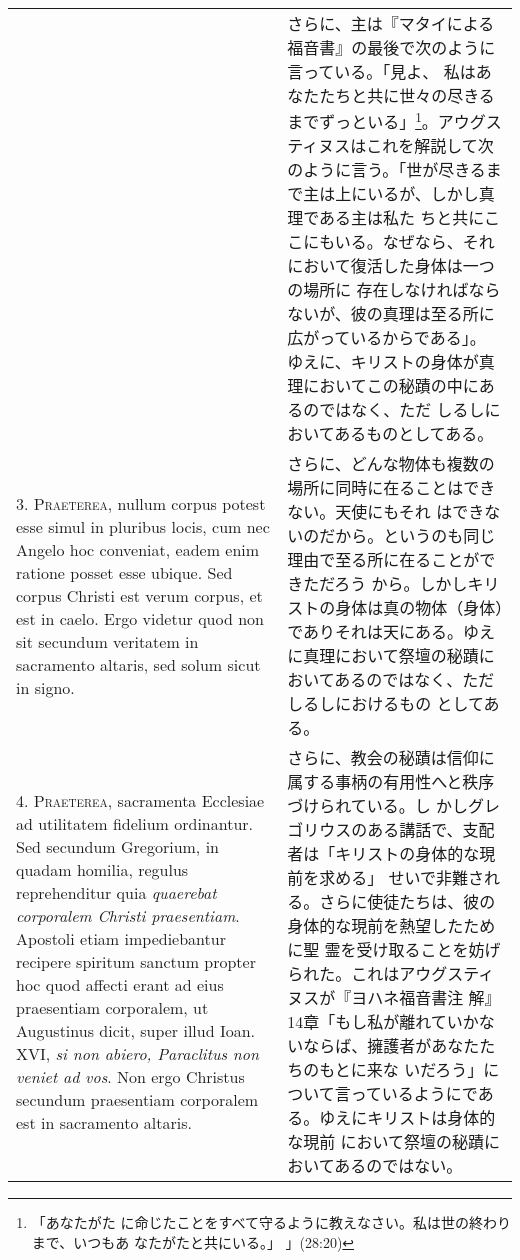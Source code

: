\documentclass[10pt]{jsarticle} %
\begin{document}
\begin{longtable}{p{21em}p{21em}}
&

さらに、主は『マタイによる福音書』の最後で次のように言っている。「見よ、
私はあなたたちと共に世々の尽きるまでずっといる」\footnote{「あなたがた
に命じたことをすべて守るように教えなさい。私は世の終わりまで、いつもあ
なたがたと共にいる。」 」(28:20)}。アウグスティヌスはこれを解説して次
のように言う。「世が尽きるまで主は上にいるが、しかし真理である主は私た
ちと共にここにもいる。なぜなら、それにおいて復活した身体は一つの場所に
存在しなければならないが、彼の真理は至る所に広がっているからである」。
ゆえに、キリストの身体が真理においてこの秘蹟の中にあるのではなく、ただ
しるしにおいてあるものとしてある。


\\




3. {\scshape Praeterea}, nullum corpus potest esse simul in pluribus
locis, cum nec Angelo hoc conveniat, eadem enim ratione posset esse
ubique. Sed corpus Christi est verum corpus, et est in caelo. Ergo
videtur quod non sit secundum veritatem in sacramento altaris, sed
solum sicut in signo.


&


さらに、どんな物体も複数の場所に同時に在ることはできない。天使にもそれ
はできないのだから。というのも同じ理由で至る所に在ることができただろう
から。しかしキリストの身体は真の物体（身体）でありそれは天にある。ゆえ
に真理において祭壇の秘蹟においてあるのではなく、ただしるしにおけるもの
としてある。

\\




4. {\scshape Praeterea}, sacramenta Ecclesiae ad utilitatem fidelium
ordinantur. Sed secundum Gregorium, in quadam homilia, regulus
reprehenditur quia {\itshape quaerebat corporalem Christi
praesentiam}. Apostoli etiam impediebantur recipere spiritum sanctum
propter hoc quod affecti erant ad eius praesentiam corporalem, ut
Augustinus dicit, super illud Ioan. XVI, {\itshape si non abiero,
Paraclitus non veniet ad vos}. Non ergo Christus secundum praesentiam
corporalem est in sacramento altaris.

&

さらに、教会の秘蹟は信仰に属する事柄の有用性へと秩序づけられている。し
かしグレゴリウスのある講話で、支配者は「キリストの身体的な現前を求める」
せいで非難される。さらに使徒たちは、彼の身体的な現前を熱望したために聖
霊を受け取ることを妨げられた。これはアウグスティヌスが『ヨハネ福音書注
解』14章「もし私が離れていかないならば、擁護者があなたたちのもとに来な
いだろう」について言っているようにである。ゆえにキリストは身体的な現前
において祭壇の秘蹟においてあるのではない。



\end{longtable}
\end{document}
